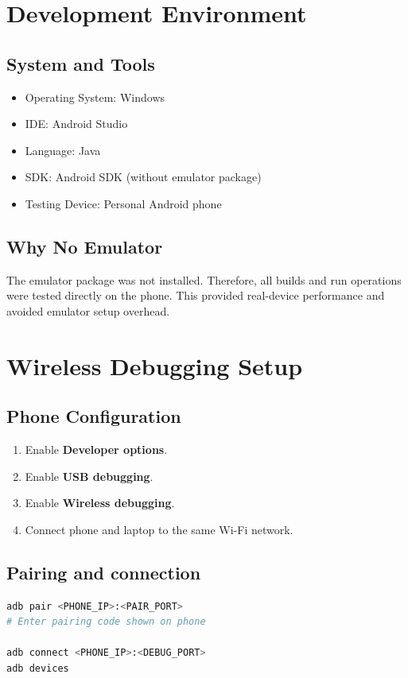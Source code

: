 \documentclass[12pt]{article}
\begin{document}
\section{Development Environment}
\subsection{System and Tools}
\begin{itemize}[leftmargin=*]
    \item Operating System: Windows
    \item IDE: Android Studio
    \item Language: Java
    \item SDK: Android SDK (without emulator package)
    \item Testing Device: Personal Android phone
\end{itemize}

\subsection{Why No Emulator}
The emulator package was not installed. Therefore, all builds and run operations were tested directly on the phone. This provided real-device performance and avoided emulator setup overhead.

\section{Wireless Debugging Setup}
\subsection{Phone Configuration}
\begin{enumerate}[leftmargin=*]
    \item Enable \textbf{Developer options}.
    \item Enable \textbf{USB debugging}.
    \item Enable \textbf{Wireless debugging}.
    \item Connect phone and laptop to the same Wi-Fi network.
\end{enumerate}

\subsection{Pairing and connection}
\begin{lstlisting}[language=bash,caption={Wireless debugging commands}]
adb pair <PHONE_IP>:<PAIR_PORT>
# Enter pairing code shown on phone

adb connect <PHONE_IP>:<DEBUG_PORT>
adb devices
\end{lstlisting}
\end{document}
